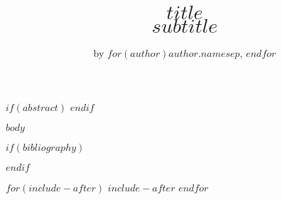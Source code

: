 \documentclass[letterpaper,onecolumn]{article}
\title{$title$ \\ $subtitle$}
\author{by $for(author)$$author.name$$sep$, $endfor$}
\begin{document}
\maketitle
$if(abstract)$
$endif$

$body$

$if(bibliography)$

$endif$

$for(include-after)$
$include-after$
$endfor$
\end{document}
